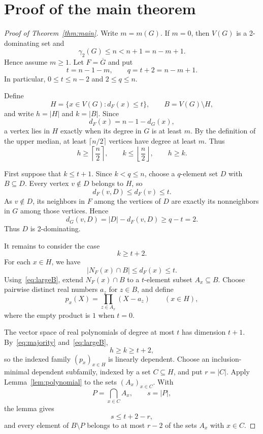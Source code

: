 \documentclass[11pt]{article}
\theoremstyle{remark}
\newcommand{\gammatwo}{\gamma_{2}}
\begin{document}
\section{Proof of the main theorem}

\begin{proof}[Proof of Theorem~\ref{thm:main}]
Write $m=m(G)$.  If $m=0$, then $V(G)$ is a 2-dominating set and
\[
  \gammatwo(G)\leq n<n+1=n-m+1.
\]
Hence assume $m\geq 1$.  Let $F=\overline G$ and put
\[
  t=n-1-m,
  \qquad q=t+2=n-m+1.
\]
In particular, $0\leq t\leq n-2$ and $2\leq q\leq n$.

Define
\[
  H=\{x\in V(G):d_F(x)\leq t\},
  \qquad B=V(G)\setminus H,
\]
and write $h=|H|$ and $k=|B|$.  Since
\[
  d_F(x)=n-1-d_G(x),
\]
a vertex lies in $H$ exactly when its degree in $G$ is at least $m$.  By the
definition of the upper median, at least $\lceil n/2\rceil$ vertices have
degree at least $m$.  Thus
\begin{equation}\label{eq:majority}
  h\geq\left\lceil\frac n2\right\rceil,
  \qquad
  k\leq\left\lfloor\frac n2\right\rfloor,
  \qquad h\geq k.
\end{equation}

First suppose that $k\leq t+1$.  Since $k<q\leq n$, choose a $q$-element set
$D$ with $B\subseteq D$.  Every vertex $v\notin D$ belongs to $H$, so
\[
  d_F(v,D)\leq d_F(v)\leq t.
\]
As $v\notin D$, its neighbors in $F$ among the vertices of $D$ are exactly
its nonneighbors in $G$ among those vertices.  Hence
\[
  d_G(v,D)=|D|-d_F(v,D)\geq q-t=2.
\]
Thus $D$ is 2-dominating.

It remains to consider the case
\begin{equation}\label{eq:largeB}
  k\geq t+2.
\end{equation}
For each $x\in H$, we have
\[
  |N_F(x)\cap B|\leq d_F(x)\leq t.
\]
Using~\eqref{eq:largeB}, extend $N_F(x)\cap B$ to a $t$-element subset
$A_x\subseteq B$.  Choose pairwise distinct real numbers $a_z$ for $z\in B$,
and define
\[
  p_x(X)=\prod_{z\in A_x}(X-a_z) \qquad (x\in H),
\]
where the empty product is $1$ when $t=0$.

The vector space of real polynomials of degree at most $t$ has dimension
$t+1$.  By~\eqref{eq:majority} and~\eqref{eq:largeB},
\[
  h\geq k\geq t+2,
\]
so the indexed family $(p_x)_{x\in H}$ is linearly dependent.  Choose an
inclusion-minimal dependent subfamily, indexed by a set $C\subseteq H$, and
put $r=|C|$.  Apply Lemma~\ref{lem:polynomial} to the sets $(A_x)_{x\in C}$.
With
\[
  P=\bigcap_{x\in C}A_x,
  \qquad s=|P|,
\]
the lemma gives
\begin{equation}\label{eq:intersection}
  s\leq t+2-r,
\end{equation}
and every element of $B\setminus P$ belongs to at most $r-2$ of the sets
$A_x$ with $x\in C$.


\end{proof}
\end{document}
